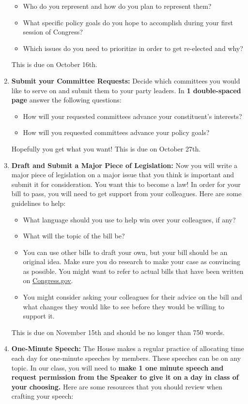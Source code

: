 \documentclass[11pt]{article}
\begin{document}
\begin{enumerate}
		\begin{itemize}
			\item Who do you represent and how do you plan to represent them?
			\item What specific policy goals do you hope to accomplish during your first session of Congress?
			\item Which issues do you need to prioritize in order to get re-elected and why? 
		\end{itemize} 
		{\color{red} This is due on October 16th.}
	\item \textbf{Submit your Committee Requests:} Decide which committees you would like to serve on and submit them to your party leaders. In \textbf{1 double-spaced page} answer the following questions: 
		\begin{itemize}
			\item How will your requested committees advance your constituent's interests?
			\item How will you requested committees advance your policy goals?
		\end{itemize}
		Hopefully you get what you want! {\color{red} This is due on October 27th.}
	\item \textbf{Draft and Submit a Major Piece of Legislation:} Now you will write a major piece of legislation on a major issue that you think is important and submit it for consideration. You want this to become a law! In order for your bill to pass, you will need to get support from your colleagues. Here are some guidelines to help:
		\begin{itemize}
			\item What language should you use to help win over your colleagues, if any?
			\item What will the topic of the bill be?
			\item You can use other bills to draft your own, but your bill should be an original idea. Make sure you do research to make your case as convincing as possible. You might want to refer to actual bills that have been written on \href{https://www.congress.gov}{Congress.gov}.
			\item You might consider asking your colleagues for their advice on the bill and what changes they would like to see before they would be willing to support it.
		\end{itemize}
		{\color{red} This is due on November 15th and should be no longer than 750 words.}
	\item \textbf{One-Minute Speech:} The House makes a regular practice of allocating time each day for one-minute speeches by members. These speeches can be on any topic. In our class, you will need to \textbf{make 1 one minute speech and request permission from the Speaker to give it on a day in class of your choosing.} Here are some resources that you should review when crafting your speech:

\end{enumerate}
\end{document}
